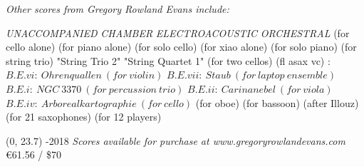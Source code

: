 \documentclass[10pt]{article}
\begin{document}

\vspace*{4\baselineskip}
\begin{center}
\textit{\fontsize{.7cm}{1em}\selectfont Other scores from Gregory Rowland Evans include:} \hfill
\end{center}
\vspace*{6\baselineskip}
{
\begin{center}
\setlength{\columnseprule}{1pt}
\setlength{\columnsep}{6em}

\begin{paracol}{4}
\textit{\fontsize{.4cm}{1em}\selectfont UNACCOMPANIED}
\switchcolumn[1]
\textit{\fontsize{.4cm}{1em}\selectfont CHAMBER}
\switchcolumn[2]
\textit{\fontsize{.4cm}{1em}\selectfont ELECTROACOUSTIC}
\switchcolumn[3]
\textit{\fontsize{.4cm}{1em}\selectfont ORCHESTRAL}
\switchcolumn[0]
\fontsize{.1cm}{0.5em}  (for cello alone)
\switchcolumn[0]
\fontsize{.1cm}{0.5em}  (for piano alone)
\switchcolumn[0]
\fontsize{.1cm}{0.5em}  (for solo cello)
 \switchcolumn[0]
\fontsize{.1cm}{0.5em}  (for xiao alone)
  \switchcolumn[0]
\fontsize{.1cm}{0.5em}  (for solo piano)
\switchcolumn[1]
\fontsize{.1cm}{0.5em} 
\switchcolumn[1]
\fontsize{.1cm}{0.5em} 
\switchcolumn[1]
\fontsize{.1cm}{0.5em}  (for string trio)
\switchcolumn[1]
\fontsize{.1cm}{0.5em}  "String Trio 2"
\switchcolumn[1]
\fontsize{.1cm}{0.5em}  "String Quartet 1"
\switchcolumn[1]
\fontsize{.1cm}{0.5em}  (for two cellos)
\switchcolumn[1]
\fontsize{.1cm}{0.5em}  (fl asax vc)
\switchcolumn[2]
\fontsize{.1cm}{0.5em} :
\switchcolumn[2]
\fontsize{.05cm}{0.5em} $B.E.vi: \ Ohrenquallen \ (for \ violin)$
\switchcolumn[2]
\fontsize{.05cm}{0.5em} $B.E.vii: \ Staub \ (for \ laptop \ ensemble)$
\switchcolumn[2]
\fontsize{.05cm}{0.5em} $B.E.i: \ NGC \ 3370 \ (for \ percussion \ trio)$
\switchcolumn[2]
\fontsize{.05cm}{0.5em} $B.E.ii: \ Carinanebel \ (for \ viola)$
\switchcolumn[2]
\fontsize{.05cm}{0.5em} $B.E.iv: \ Arborealkartographie \ (for \ cello)$
\switchcolumn[2]
\fontsize{.1cm}{0.5em}  (for oboe)
\switchcolumn[2]
\fontsize{.1cm}{0.5em}  (for bassoon)
\switchcolumn[3]
\fontsize{.1cm}{0.5em} 
\switchcolumn[3]
\fontsize{.1cm}{0.5em}  (after Illouz)
\switchcolumn[3]
\fontsize{.1cm}{0.5em}  (for 21 saxophones)
\switchcolumn[3]
\fontsize{.1cm}{0.5em}  (for 12 players)


\end{paracol}
\end{center}
}

\begin{textblock}{23}(0, 23.7)
-2018 \hfill
\textit{Scores available for purchase at www.gregoryrowlandevans.com} \hfill
\euro 61.56 / \$70
\end{textblock}
\end{document}
